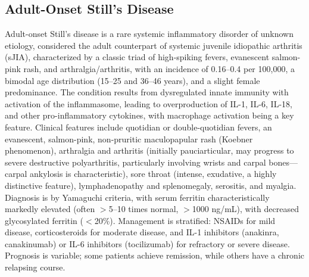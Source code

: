 \subsection{Adult-Onset Still's Disease}
\label{sec:Adult-Onset Still's Disease (AOSD)}
Adult-onset Still's disease is a rare systemic inflammatory disorder of unknown etiology, considered the adult counterpart of systemic juvenile idiopathic arthritis (sJIA), characterized by a classic triad of high-spiking fevers, evanescent salmon-pink rash, and arthralgia/arthritis, with an incidence of 0.16--0.4 per 100,000, a bimodal age distribution (15--25 and 36--46 years), and a slight female predominance. The condition results from dysregulated innate immunity with activation of the inflammasome, leading to overproduction of IL-1, IL-6, IL-18, and other pro-inflammatory cytokines, with macrophage activation being a key feature. Clinical features include quotidian or double-quotidian fevers, an evanescent, salmon-pink, non-pruritic maculopapular rash (Koebner phenomenon), arthralgia and arthritis (initially pauciarticular, may progress to severe destructive polyarthritis, particularly involving wrists and carpal bones---carpal ankylosis is characteristic), sore throat (intense, exudative, a highly distinctive feature), lymphadenopathy and splenomegaly, serositis, and myalgia. Diagnosis is by Yamaguchi criteria, with serum ferritin characteristically markedly elevated (often $>$5--10 times normal, $>$1000 ng/mL), with decreased glycosylated ferritin ($<$20\%). Management is stratified: NSAIDs for mild disease, corticosteroids for moderate disease, and IL-1 inhibitors (anakinra, canakinumab) or IL-6 inhibitors (tocilizumab) for refractory or severe disease. Prognosis is variable; some patients achieve remission, while others have a chronic relapsing course.

